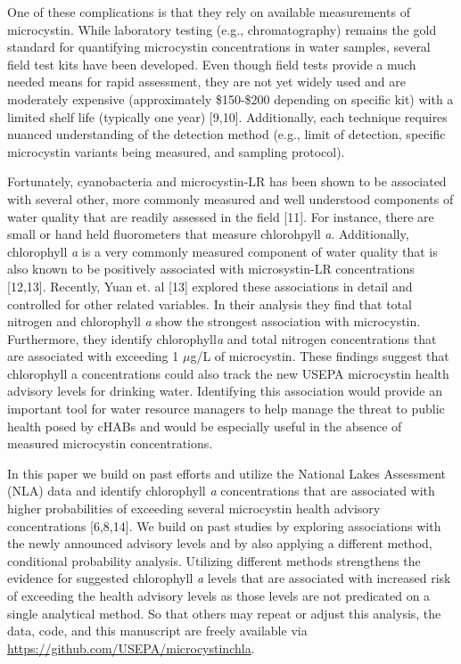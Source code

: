 \documentclass[11pt,]{article}
\begin{document}
One of these complications is that they rely on available measurements
of microcystin. While laboratory testing (e.g., chromatography) remains
the gold standard for quantifying microcystin concentrations in water
samples, several field test kits have been developed. Even though field
tests provide a much needed means for rapid assessment, they are not yet
widely used and are moderately expensive (approximately \$150-\$200
depending on specific kit) with a limited shelf life (typically one
year) {[}9,10{]}. Additionally, each technique requires nuanced
understanding of the detection method (e.g., limit of detection,
specific microcystin variants being measured, and sampling protocol).

Fortunately, cyanobacteria and microcystin-LR has been shown to be
associated with several other, more commonly measured and well
understood components of water quality that are readily assessed in the
field {[}11{]}. For instance, there are small or hand held fluorometers
that measure chlorohpyll \emph{a}. Additionally, chlorophyll \emph{a} is
a very commonly measured component of water quality that is also known
to be positively associated with microsystin-LR concentrations
{[}12,13{]}. Recently, Yuan et. al {[}13{]} explored these associations
in detail and controlled for other related variables. In their analysis
they find that total nitrogen and chlorophyll \emph{a} show the
strongest association with microcystin. Furthermore, they identify
chlorophyll\emph{a} and total nitrogen concentrations that are
associated with exceeding 1 \(\mu\)g/L of microcystin. These findings
suggest that chlorophyll a concentrations could also track the new USEPA
microcystin health advisory levels for drinking water. Identifying this
association would provide an important tool for water resource managers
to help manage the threat to public health posed by cHABs and would be
especially useful in the absence of measured microcystin concentrations.

In this paper we build on past efforts and utilize the National Lakes
Assessment (NLA) data and identify chlorophyll \emph{a} concentrations
that are associated with higher probabilities of exceeding several
microcystin health advisory concentrations {[}6,8,14{]}. We build on
past studies by exploring associations with the newly announced advisory
levels and by also applying a different method, conditional probability
analysis. Utilizing different methods strengthens the evidence for
suggested chlorophyll \emph{a} levels that are associated with increased
risk of exceeding the health advisory levels as those levels are not
predicated on a single analytical method. So that others may repeat or
adjust this analysis, the data, code, and this manuscript are freely
available via
\href{https://github.com/USAPE/microcystinchla}{https://github.com/USEPA/microcystinchla}.
\end{document}

